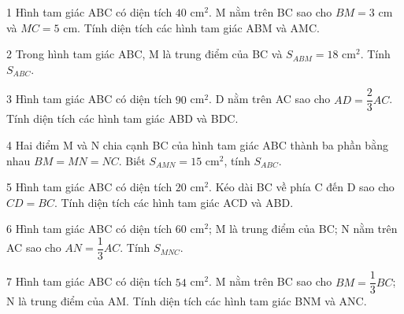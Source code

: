 \begin{probbox}{1}{\relax}
Hình tam giác ABC có diện tích $40$ cm$^2$. M nằm trên BC sao cho $BM=3$ cm và $MC=5$ cm. Tính diện tích các hình tam giác ABM và AMC.
\end{probbox}
\gap
\begin{probbox}{2}{\relax}
Trong hình tam giác ABC, M là trung điểm của BC và $S_{ABM}=18$ cm$^2$. Tính $S_{ABC}$.
\end{probbox}
\gap
\begin{probbox}{3}{\relax}
Hình tam giác ABC có diện tích $90$ cm$^2$. D nằm trên AC sao cho $AD=\dfrac23AC$. Tính diện tích các hình tam giác ABD và BDC.
\end{probbox}
\gap
\begin{probbox}{4}{\relax}
Hai điểm M và N chia cạnh BC của hình tam giác ABC thành ba phần bằng nhau $BM=MN=NC$. Biết $S_{AMN}=15$ cm$^2$, tính $S_{ABC}$.
\end{probbox}
\gap
\begin{probbox}{5}{\relax}
Hình tam giác ABC có diện tích $20$ cm$^2$. Kéo dài BC về phía C đến D sao cho $CD=BC$. Tính diện tích các hình tam giác ACD và ABD.
\end{probbox}
\gap
\begin{probbox}{6}{\relax}
Hình tam giác ABC có diện tích $60$ cm$^2$; M là trung điểm của BC; N nằm trên AC sao cho $AN=\dfrac13AC$. Tính $S_{MNC}$.
\end{probbox}
\gap
\begin{probbox}{7}{\relax}
Hình tam giác ABC có diện tích $54$ cm$^2$. M nằm trên BC sao cho $BM=\dfrac13BC$; N là trung điểm của AM. Tính diện tích các hình tam giác BNM và ANC.
\end{probbox}
